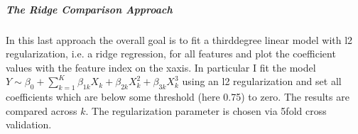 \documentclass[letterpaper,10pt,english]{sphinxmanual}
\begin{document}
\noindent{}


\subparagraph{The Ridge Comparison Approach}
\label{\detokenize{simulated_reverse_engineering:the-ridge-comparison-approach}}
In this last approach the overall goal is to fit a third\sphinxhyphen{}degree linear model with l2 regularization, i.e. a ridge regression, for all features and plot the coefficient values with the feature index on the x\sphinxhyphen{}axis. In particular I fit the model \(Y \sim \beta_0 + \sum_{k=1}^K \beta_{1k} X_k + \beta_{2k} X_k^2 + \beta_{3k} X_k^3\) using an l2 regularization and set all coefficients which are below some threshold (here 0.75) to zero. The results are compared across \(k\). The regularization parameter is chosen via 5\sphinxhyphen{}fold cross validation.
\end{document}
